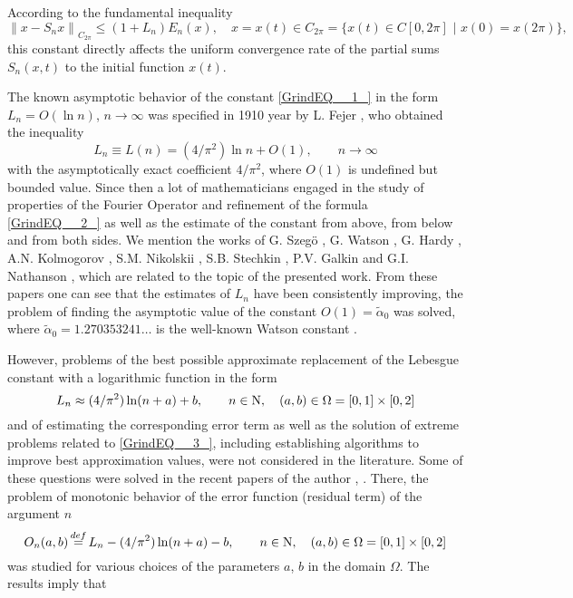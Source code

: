 \documentclass[
11pt,%
tightenlines,%
twoside,%
onecolumn,%
nofloats,%
nobibnotes,%
nofootinbib,%
superscriptaddress,%
noshowpacs,%
centertags]%
{revtex4}
\begin{document}
According to the fundamental inequality
\begin{equation*}
\left\| x  -   S_{n} x \right\| _{C_{2\pi } } \le    (1  +   L_{n} )  E_{n} (x), \quad x=x(t)  \in C_{2\pi }  = \{  x(t)\in   C[0,  2\pi ] \,\,  \left| \,\, x(0)  =x(2\pi )\right.  \} ,
\end{equation*}
this constant directly affects the uniform convergence rate of the partial sums $S_{n} (x, t)$ to the initial function $x(t)$.

The known asymptotic behavior of the constant \eqref{GrindEQ__1_} in the form $L_{n} = O(\ln n)$, $n\to \infty$ was specified in 1910 year by L. Fejer \cite{F}, who obtained the inequality
\begin{equation} \label{GrindEQ__2_}
L_{n} \equiv L(n)  =  (4/\pi ^{2} )\ln n  +  O(1) , \qquad      n\to \infty
\end{equation}
with the asymptotically exact coefficient $4/\pi ^{2} $, where $O(1)$ is undefined but bounded value. Since then a lot of mathematicians engaged in the study of properties of the Fourier Operator and refinement of the formula \eqref{GrindEQ__2_} as well as the estimate of the constant from above, from below and from both sides. We mention the works of G. Szeg\"o \cite{Sz}, G. Watson \cite{W}, G. Hardy \cite{H}, A.N. Kolmogorov \cite{K}, S.M. Nikolskii \cite{Nik}, S.B. Stechkin \cite{St}, P.V. Galkin \cite{G} and G.I. Nathanson \cite{Nat}, which are related to the topic of the presented work. From these papers one can see that the estimates of $L_{n}$ have been consistently improving, the problem of finding the asymptotic value of the constant $O(1)=\tilde{\alpha }_{0} $ was solved, where  $\tilde{\alpha }_{0} = 1.270353241\dots $ is the well-known Watson constant \cite{W}.

However, problems of the best possible approximate replacement of the Lebesgue constant with a logarithmic function in the form
\begin{equation} \label{GrindEQ__3_} L_{n} \approx   (4/\pi ^{2} )\ln (n+a)  +  b,   \qquad    n\in {\rm N} ,  \quad         (a,  b)\in   \Omega   =[0,  1] \times [0,  2]  \end{equation}
and of estimating the corresponding error term as well as the solution of extreme problems related to \eqref{GrindEQ__3_}, including establishing algorithms to improve best approximation values, were not considered in the literature. Some of these questions were solved in the recent papers of the author \cite{Sh19}, \cite{Sh18}. There, the problem of monotonic behavior of the error function (residual term) of the argument $n$
\begin{equation} \label{GrindEQ__4_} O_{n} (a,b)\mathop{=}\limits^{def} L_{n} - (4/\pi ^{2} )\ln (n+a) - b,\qquad n\in {\rm N},   \quad     (a,  b)\in   \Omega  =[0,  1]\times [0, 2]
\end{equation}
was studied for various choices of the parameters $a$, $b$ in the domain $\Omega$. The results imply that
\end{document}
